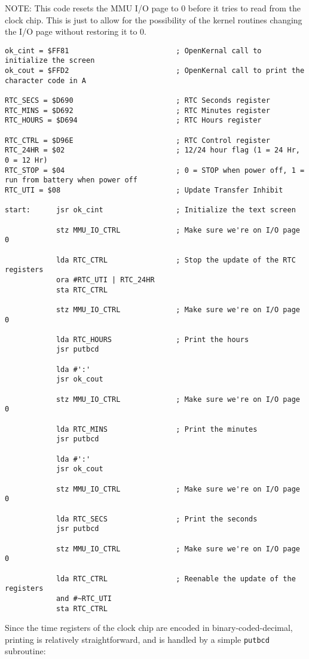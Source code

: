 NOTE: This code resets the MMU I/O page to 0 before it tries to read from the clock chip. This is just to allow for the possibility of the kernel routines changing the I/O page without restoring it to 0.

\begin{verbatim}
ok_cint = $FF81							; OpenKernal call to initialize the screen
ok_cout = $FFD2							; OpenKernal call to print the character code in A

RTC_SECS = $D690						; RTC Seconds register
RTC_MINS = $D692						; RTC Minutes register
RTC_HOURS = $D694						; RTC Hours register

RTC_CTRL = $D96E						; RTC Control register
RTC_24HR = $02							; 12/24 hour flag (1 = 24 Hr, 0 = 12 Hr)
RTC_STOP = $04							; 0 = STOP when power off, 1 = run from battery when power off
RTC_UTI = $08							; Update Transfer Inhibit

start:      jsr ok_cint                 ; Initialize the text screen

            stz MMU_IO_CTRL             ; Make sure we're on I/O page 0

            lda RTC_CTRL                ; Stop the update of the RTC registers
            ora #RTC_UTI | RTC_24HR
            sta RTC_CTRL

            stz MMU_IO_CTRL				; Make sure we're on I/O page 0

            lda RTC_HOURS               ; Print the hours
            jsr putbcd

            lda #':'
            jsr ok_cout

            stz MMU_IO_CTRL				; Make sure we're on I/O page 0

            lda RTC_MINS                ; Print the minutes
            jsr putbcd

            lda #':'
            jsr ok_cout

            stz MMU_IO_CTRL				; Make sure we're on I/O page 0

            lda RTC_SECS                ; Print the seconds
            jsr putbcd

            stz MMU_IO_CTRL				; Make sure we're on I/O page 0

            lda RTC_CTRL                ; Reenable the update of the registers
            and #~RTC_UTI
            sta RTC_CTRL
\end{verbatim}

Since the time registers of the clock chip are encoded in binary-coded-decimal, printing is relatively straightforward, and is handled by a simple \verb+putbcd+ subroutine:

